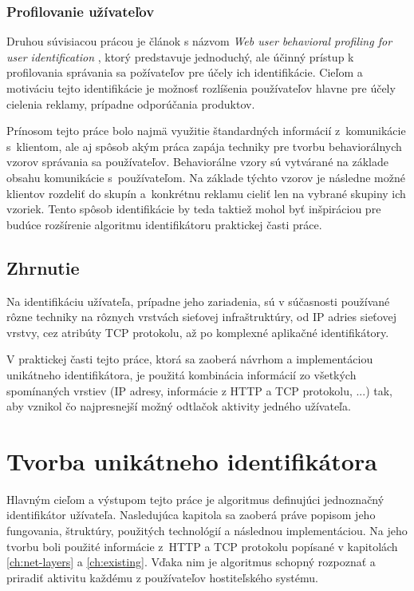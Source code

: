 \documentclass[
  digital, %
  oneside, %
  table,   %
  lof,     %
  nolot,   %
  nocover
]{fithesis3}
\begin{document}
\subsection{Profilovanie užívateľov}
Druhou súvisiacou prácou je článok s názvom \textit{Web user behavioral profiling for user identification} \cite{Yang:2010:Prof},
ktorý predstavuje
jednoduchý, ale účinný prístup k profilovania správania sa požívateľov pre účely ich identifikácie.
Cieľom a motiváciu tejto identifikácie je možnosť rozlíšenia používateľov hlavne pre účely cielenia
reklamy, prípadne odporúčania produktov.

Prínosom tejto práce bolo najmä využitie štandardných informácií z~komunikácie s~klientom, ale aj spôsob akým práca zapája 
techniky pre tvorbu behaviorálnych vzorov správania sa používateľov. Behaviorálne vzory sú vytvárané na základe obsahu komunikácie
s~používateľom. Na základe týchto vzorov je následne možné klientov
rozdeliť do skupín a~konkrétnu reklamu cieliť len na vybrané skupiny ich vzoriek. Tento spôsob identifikácie by teda taktiež mohol byť inšpiráciou
pre budúce rozšírenie algoritmu identifikátoru praktickej časti práce.

\section{Zhrnutie}
Na identifikáciu užívateľa, prípadne jeho zariadenia, sú v súčasnosti
používané rôzne techniky na rôznych vrstvách sieťovej infraštruktúry, od IP
adries sieťovej vrstvy, cez atribúty TCP protokolu, až po komplexné aplikačné
identifikátory. 

V praktickej časti tejto práce, ktorá sa zaoberá návrhom a implementáciou
unikátneho identifikátora, je použitá kombinácia informácií zo všetkých
spomínaných vrstiev (IP adresy, informácie z HTTP a TCP protokolu, ...) tak,
aby vznikol čo najpresnejší možný odtlačok aktivity jedného užívateľa.

\chapter{Tvorba unikátneho identifikátora}
\label{ch:footprint}
Hlavným cieľom a výstupom tejto práce je algoritmus definujúci jednoznačný
identifikátor užívateľa. Nasledujúca kapitola sa zaoberá práve popisom jeho
fungovania, štruktúry, použitých technológií a následnou implementáciou. Na
jeho tvorbu boli použité informácie z~HTTP a TCP protokolu popísané v
kapitolách \ref{ch:net-layers} a \ref{ch:existing}. Vďaka nim je algoritmus
schopný rozpoznať a priradiť aktivitu každému z používateľov hostiteľského
systému.
\end{document}
